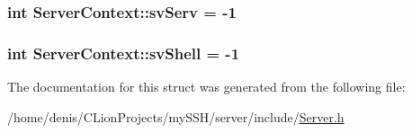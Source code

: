 \subsubsection[{\texorpdfstring{sv\+Serv}{svServ}}]{\setlength{\rightskip}{0pt plus 5cm}int Server\+Context\+::sv\+Serv = -\/1}\hypertarget{structServerContext_a728b751fab25a3042eb9e6b668bc9fb3}{}\label{structServerContext_a728b751fab25a3042eb9e6b668bc9fb3}
\subsubsection[{\texorpdfstring{sv\+Shell}{svShell}}]{\setlength{\rightskip}{0pt plus 5cm}int Server\+Context\+::sv\+Shell = -\/1}\hypertarget{structServerContext_a2d08d74a2daaedabbcce115bdf8f05fa}{}\label{structServerContext_a2d08d74a2daaedabbcce115bdf8f05fa}


The documentation for this struct was generated from the following file\+:\begin{DoxyCompactItemize}
\item 
/home/denis/\+C\+Lion\+Projects/my\+S\+S\+H/server/include/\hyperlink{Server_8h}{Server.\+h}\end{DoxyCompactItemize}

